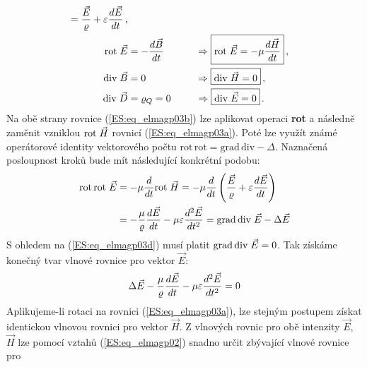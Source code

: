 {\begin{subequations}
\begin{align}
{                       = \frac{\vec{E}}{\varrho} + 
                         \varepsilon\dfrac{d \vec{E}}{d t}}\, ,    \label{ES:eq_elmagp03a} \\
        \mathrm{rot}\;\vec{E}   &= - \dfrac{d \vec{B}}{d t}
                     \qquad\quad\, \Rightarrow \boxed{\mathrm{rot}\;\vec{E} 
                       = -\mu\dfrac{d \vec{H}}{d t}}\, ,           \label{ES:eq_elmagp03b} \\
        \mathrm{div}\;\vec{B} &= 0 \qquad\qquad\quad \Rightarrow \boxed{\mathrm{div}\;\vec{H} 
                       = 0}\, ,                              \label{ES:eq_elmagp03c} \\
        \mathrm{div}\;\vec{D} &= \varrho_Q = 0 \quad\quad\,\,\, \Rightarrow \boxed{\mathrm{div}\;\vec{E}
                       = 0}\, .                              \label{ES:eq_elmagp03d}
      \end{align}
    \end{subequations}
    Na obě strany rovnice (\ref{ES:eq_elmagp03b}) lze aplikovat operaci \textbf{rot} a následně 
    zaměnit vzniklou \(\mathrm{rot}\;\vec{H}\) rovnicí (\ref{ES:eq_elmagp03a}). Poté lze využít známé operátorové 
    identity vektorového počtu \(\text{rot}\,\text{rot} = \text{grad}\,\text{div} -\Delta\). 
    Naznačená posloupnost kroků bude mít následující konkrétní podobu:
    \begin{align}
     \text{rot}\,\mathrm{rot}\;\vec{E} &= -\mu\dfrac{d }{d t}\mathrm{rot}\;\vec{H} 
                          = -\mu\dfrac{d }{d t}
                             \left(
                               \frac{\vec{E}}{\varrho} +
                               \varepsilon\dfrac{d \vec{E}}{d t}
                              \right)                            \nonumber  \\
                         &= - \frac{\mu}{\varrho}\dfrac{d \vec{E}}{d t} - 
                              \mu\varepsilon\dfrac{d^2 \vec{E}}{d t^2} 
                          = \text{grad}\,\mathrm{div}\;\vec{E} - \Delta\vec{E}  \label{ES:eq_elmagp04}
    \end{align}
    S ohledem na (\ref{ES:eq_elmagp03d}) musí platit \(\text{grad}\,\mathrm{div}\;\vec{E} = 0\). Tak získáme 
    konečný tvar vlnové rovnice pro vektor \(\vec{E}\):
    \begin{equation}\label{ES:eq_elmagp05}
      \Delta\vec{E} - \frac{\mu}{\varrho}\dfrac{d \vec{E}}{d t} - \mu\varepsilon\dfrac{d^2 \vec{E}}{d t^2} = 0
    \end{equation}
    Aplikujeme-li rotaci na rovnici (\ref{ES:eq_elmagp03a}), lze stejným postupem získat identickou 
    vlnovou rovnici pro vektor \(\vec{H}\). Z vlnových rovnic pro obě intenzity \(\vec{E}\), 
    \(\vec{H}\) lze pomocí vztahů (\ref{ES:eq_elmagp02}) snadno určit zbývající vlnové rovnice pro 
}
